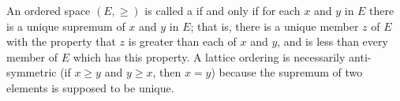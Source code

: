 An ordered space $(E, \geq)$ is called a  if and only if for each $x$ and $y$ in $E$ there is a unique supremum of $x$ and $y$ in $E$; that is, there is a unique member $z$ of $E$ with the property that $z$ is greater than each of $x$ and $y$, and is less than every member of $E$ which has this property. A lattice ordering is necessarily anti-symmetric (if $x \geq y$ and $y \geq x$, then $x = y$) because the supremum of two elements is supposed to be unique.
